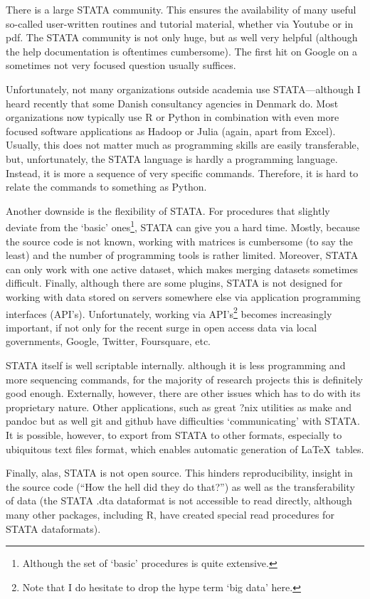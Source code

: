 \documentclass[fleqn,10pt]{SelfArx} %
\begin{document}
There is a large STATA community. This ensures the availability of many useful so-called user-written routines and tutorial material, whether via Youtube or in pdf. The STATA community is not only huge, but as well very helpful (although the help documentation is oftentimes cumbersome). The first hit on Google on a sometimes not very focused question usually suffices.

Unfortunately, not many organizations outside academia use STATA---although I heard recently that some Danish consultancy agencies in Denmark do. Most organizations now typically use R or Python in combination with even more focused software applications as Hadoop or Julia (again, apart from Excel). Usually, this does not matter much as programming skills are easily transferable, but, unfortunately, the STATA language is hardly a programming language. Instead, it is more a sequence of very specific commands. Therefore, it is hard to relate the commands to something as Python.

Another downside is the flexibility of STATA. For procedures that slightly deviate from the `basic' ones\footnote{Although the set of `basic' procedures is quite extensive.}, STATA can give you a hard time. Mostly, because the source code is not known, working with matrices is cumbersome (to say the least) and the number of programming tools is rather limited. Moreover, STATA can only work with one active dataset, which makes merging datasets sometimes difficult. Finally, although there are some plugins, STATA is not designed for working with data stored on servers somewhere else via application programming interfaces (API's). Unfortunately, working via API's\footnote{Note that I do hesitate to drop the hype term `big data' here.} becomes increasingly important, if not only for the recent surge in open access data via local governments, Google, Twitter, Foursquare, etc.

STATA itself is well scriptable internally. although it is less programming and more sequencing commands, for the majority of research projects this is definitely good enough. Externally, however, there are other issues which has to do with its proprietary nature. Other applications, such as great ?nix utilities as make and pandoc but as well git and github have difficulties `communicating' with STATA. It is possible, however, to export from STATA to other formats, especially to ubiquitous text files format, which enables automatic generation of \LaTeX\ tables.

Finally, alas, STATA is not open source. This hinders reproducibility, insight in the source code (``How the hell did they do that?'') as well as the transferability of data (the STATA .dta dataformat is not accessible to read directly, although many other packages, including R, have created special read procedures for STATA dataformats).
\end{document}
